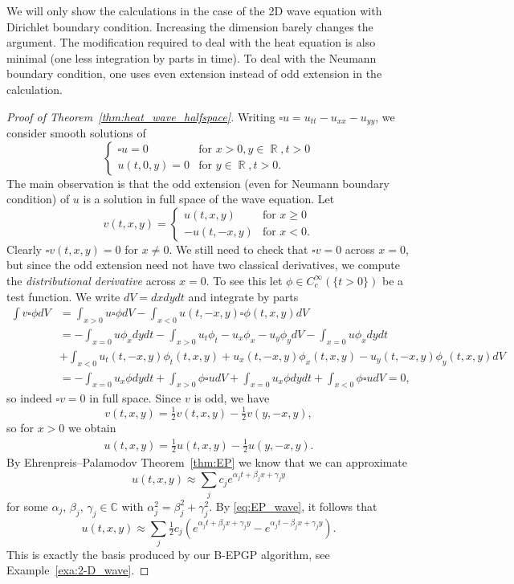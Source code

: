 \documentclass{article} %
\theoremstyle{plain}
\theoremstyle{definition}
\theoremstyle{remark}
\DeclareMathOperator*{\R}{\mathbb{R}}
\newcommand{\CC}{\mathbb{C}}
\begin{document}
We will  only show the calculations in the case of the 2D wave equation with Dirichlet boundary condition. Increasing the dimension barely changes the argument. The modification required to deal with the heat equation is also minimal (one less integration by parts in time). To deal with the Neumann boundary condition, one uses even extension instead of odd extension in the calculation.
\begin{proof}[Proof of Theorem~\ref{thm:heat_wave_halfspace}]
Writing $\square u=u_{tt}-u_{xx}-u_{yy}$, we consider smooth solutions of 
$$
\begin{cases}
    \square u=0&\text{for }x>0,y\in\R,t>0\\
    u(t,0,y)=0&\text{for }y\in\R,t>0.
\end{cases}
$$
The main observation is that the odd extension (even for Neumann boundary condition) of $u$ is a solution in full space of the wave equation. Let 
$$
v(t,x,y)=\begin{cases}
    u(t,x,y)&\text{for }x\geq 0\\
    -u(t,-x,y)&\text{for }x<0.
\end{cases}
$$
Clearly $\square v(t,x,y)=0$ for $x\neq 0$. We still need to check that $\square v=0$ across $x=0$, but since the odd extension need not have two classical derivatives, we compute the \emph{distributional derivative} across ${x=0}$. To see this let $\phi\in C_c^\infty(\{t>0\})$ be a test function. We write $dV=dxdydt$ and integrate by parts 
\begin{align*}
    \int v\square \phi dV&=\int_{x>0} u\square \phi dV-\int_{x<0} u(t,-x,y)\square \phi(t,x,y) dV\\
    &=-\int_{x=0} u\phi_xdydt-\int_{x>0}u_t\phi_t-u_x\phi_x-u_y\phi_y dV-\int_{x=0} u\phi_xdydt\\
    &+\int_{x<0}u_t(t,-x,y)\phi_t(t,x,y)+u_x(t,-x,y)\phi_x(t,x,y)-u_y(t,-x,y)\phi_y(t,x,y) d V\\
    &=-\int_{x=0} u_x\phi dydt+\int_{x>0} \phi\square u dV+\int_{x=0} u_x\phi dydt+\int_{x<0} \phi\square u dV=0,
\end{align*}
so indeed $\square v=0$ in full space. Since $v$ is odd, we have
$$
v(t,x,y)=\tfrac{1}{2}v(t,x,y)-\tfrac{1}{2}v(y,-x,y),
$$
so for $x>0$ we obtain
\begin{align}\label{eq:EP_wave}
u(t,x,y)=\tfrac{1}{2}u(t,x,y)-\tfrac{1}{2}u(y,-x,y).
\end{align}
By Ehrenpreis--Palamodov Theorem~\ref{thm:EP} we know that we can approximate
$$
u(t,x,y)\approx \sum_{j} c_je^{\alpha_jt+\beta_jx+\gamma_jy}
$$
for some $\alpha_j,\,\beta_j,\,\gamma_j\in\CC$ with $\alpha_j^2=\beta_j^2+\gamma_j^2$. By \eqref{eq:EP_wave}, it follows that
$$
u(t,x,y)\approx \sum_{j} \tfrac{1}{2}c_j(e^{\alpha_jt+\beta_jx+\gamma_jy}-e^{\alpha_jt-\beta_jx+\gamma_jy}).
$$
This is exactly the basis produced by our B-EPGP algorithm, see Example~\ref{exa:2-D_wave}.
\end{proof}
\end{document}
